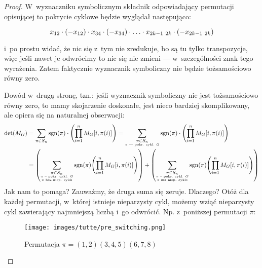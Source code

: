 \begin{proof}
	W~wyznaczniku symbolicznym składnik odpowiadający permutacji opisującej to pokrycie cyklowe będzie wyglądał następująco:

	\begin{equation*}
		x_{12} \cdot \left(-x_{12}\right) \cdot x_{34} \cdot \left(-x_{34}\right) \cdot \ldots \cdot x_{2k - 1\ 2k} \cdot \left(-x_{2k - 1\ 2k}\right)
	\end{equation*}

	i~po prostu widać, że nic się z~tym nie zredukuje, bo są tu tylko transpozycje, więc jeśli nawet je odwrócimy to nic się nie zmieni --- w~szczególności znak tego wyrażenia. Zatem faktycznie wyznacznik symboliczny nie będzie tożsamościowo równy zero.

	Dowód w~drugą stronę, tzn.: jeśli wyznacznik symboliczny nie jest tożsamościowo równy zero, to mamy skojarzenie  doskonałe, jest nieco bardziej skomplikowany, ale opiera się na naturalnej obserwacji:
	\begin{equation*}
		\begin{split}
			\det\pars{M_G}
			 & = \sum_{\pi \in S_n}\sgn\pars{\pi} \cdot \pars{\prod_{i = 1}^{n}M_G[i, \pi\pars{i}]}
			= \sum_{\substack{\pi \in S_n                                                           \\\text{\tiny $\pi$ --- pokr. cykl. $G$}}}\sgn\pars{\pi} \cdot \pars{\prod_{i = 1}^{n}M_G[i, \pi\pars{i}]}\\
			 & = \pars{\sum_{\substack{\pi \in S_n                                                  \\\text{\tiny $\pi$ -- pokr. cykl. $G$}\\\text{\tiny $\pi$ bez niep. cykli}}}\sgn\pars{\pi}\pars{\prod_{i = 1}^{n}M_G[i, \pi\pars{i}]}} + \pars{\sum_{\substack{\pi \in S_n\\\text{\tiny $\pi$ -- pokr. cykl. \(G\)}\\\text{\tiny $\pi$ ma niep. cykle}}}\sgn\pars{\pi}\pars{\prod_{i = 1}^{n}M_G[i, \pi\pars{i}]}}
		\end{split}
	\end{equation*}
	Jak nam to pomaga? Zauważmy, że druga suma się zeruje. Dlaczego? Otóż dla każdej permutacji, w~której istnieje nieparzysty cykl, możemy wziąć nieparzysty cykl zawierający najmniejszą liczbą i~go odwrócić. Np. z~poniższej permutacji \(\pi\):

	\begin{figure}[H]
		\centering
		\texttt{[image: images/tutte/pre\_switching.png]}
		\caption{Permutacja \(\pi = (1, 2)(3, 4, 5)(6, 7, 8)\)}
	\end{figure}


\end{proof}

